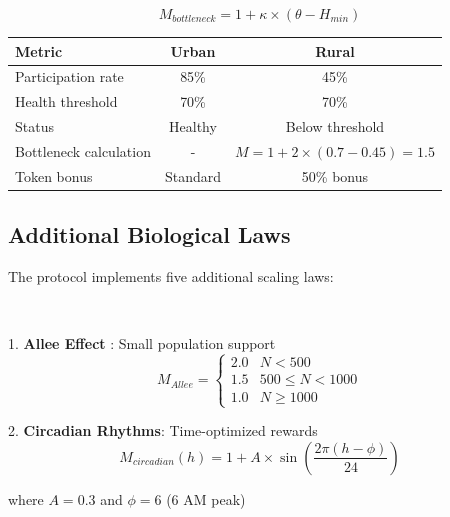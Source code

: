 \documentclass[11pt,letterpaper]{article}
\begin{document}

\begin{equation}
M_{bottleneck} = 1 + \kappa \times \left(\theta - H_{min}\right)
\end{equation}

\clearpage


\begin{table}[H]
\centering
\begin{tabular}{lcc}
\toprule
\textbf{Metric} & \textbf{Urban} & \textbf{Rural} \\
\midrule
Participation rate & 85\% & 45\% \\
Health threshold & 70\% & 70\% \\
Status & Healthy & Below threshold \\
Bottleneck calculation & - & $M = 1 + 2 \times (0.7 - 0.45) = 1.5$ \\
Token bonus & Standard & 50\% bonus \\
\bottomrule
\end{tabular}
\end{table}

\subsection{Additional Biological Laws}

The protocol implements five additional scaling laws:

~

1. \textbf{Allee Effect} \cite{allee1931animal}: Small population support
   \begin{equation}
   M_{Allee} = \begin{cases}
   2.0 & N < 500 \\
   1.5 & 500 \leq N < 1000 \\
   1.0 & N \geq 1000
   \end{cases}
   \end{equation}

2. \textbf{Circadian Rhythms}: Time-optimized rewards
   \begin{equation}
   M_{circadian}(h) = 1 + A \times \sin\left(\frac{2\pi(h - \phi)}{24}\right)
   \end{equation}
    \begin{center}
    \small
    where $A = 0.3$ and $\phi = 6$ (6 AM peak)
    \end{center}
\end{document}
